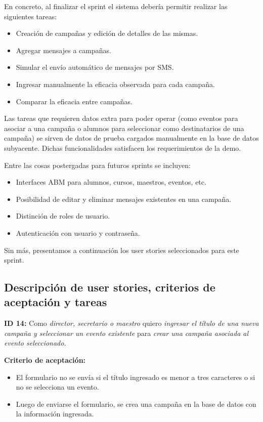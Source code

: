 \documentclass[a4paper, 10pt, twoside]{article}
\newcommand{\sprintstory}[4]{
  \noindent
  \textbf{ID #1:} Como \emph{#2} quiero \emph{#3} para \emph{#4}.
}
\newenvironment{criterios}{
  \textbf{Criterio de aceptación:}
  \begin{itemize}
}{
  \end{itemize}
}
\newcommand{\criterio}[1] {
  \item #1
}
\begin{document}
En concreto, al finalizar el sprint el sistema debería permitir realizar las siguientes tareas:

\begin{itemize}
  \item Creación de campañas y edición de detalles de las mismas.
  \item Agregar mensajes a campañas.
  \item Simular el envío automático de mensajes por SMS.
  \item Ingresar manualmente la eficacia observada para cada campaña.
  \item Comparar la eficacia entre campañas.
\end{itemize}

Las tareas que requieren datos extra para poder operar (como eventos para asociar a una campaña o alumnos para seleccionar como destinatarios de una campaña) se sirven de datos de prueba cargados manualmente en la base de datos subyacente. Dichas funcionalidades satisfacen los requerimientos de la demo.

Entre las cosas postergadas para futuros sprints se incluyen:

\begin{itemize}
  \item Interfaces ABM para alumnos, cursos, maestros, eventos, etc.
  \item Posibilidad de editar y eliminar mensajes existentes en una campaña.
  \item Distinción de roles de usuario.
  \item Autenticación con usuario y contraseña.
\end{itemize}

Sin más, presentamos a continuación los user stories seleccionados para este sprint.


\subsection{Descripción de user stories, criterios de aceptación y tareas}

\sprintstory{14}
            {director, secretario o maestro}
            {ingresar el título de una nueva campaña y seleccionar un evento existente}
            {crear una campaña asociada al evento seleccionado}

\begin{criterios}
  \criterio{El formulario no se envía si el título ingresado es menor a tres caracteres o si no se selecciona un evento.}
  \criterio{Luego de enviarse el formulario, se crea una campaña en la base de datos con la información ingresada.}
\end{criterios}
\end{document}
